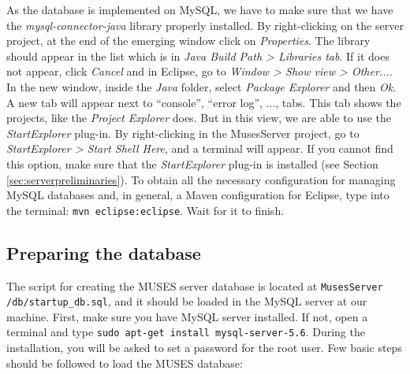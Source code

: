 As the database is implemented on MySQL, we have to make sure that we have the \textit{mysql-connector-java} library properly installed. By right-clicking on the server project, at the end of the emerging window click on \textit{Properties}. The library should appear in the list which is in \textit{Java Build Path > Libraries tab}. If it does not appear, click \textit{Cancel} and in Eclipse, go to \textit{Window > Show view > Other...}. In the new window, inside the \textit{Java} folder, select \textit{Package Explorer} and then \textit{Ok}. A new tab will appear next to ``console'', ``error log'', ..., tabs. This tab shows the projects, like the \textit{Project Explorer} does. But in this view, we are able to use the \textit{StartExplorer} plug-in. By right-clicking in the MusesServer project, go to \textit{StartExplorer > Start Shell Here}, and a terminal will appear. If you cannot find this option, make sure that the \textit{StartExplorer} plug-in is installed (see Section \ref{sec:serverpreliminaries}). To obtain all the necessary configuration for managing MySQL databases and, in general, a Maven configuration for Eclipse, type into the terminal: \texttt{mvn eclipse:eclipse}. Wait for it to finish.

\subsection{Preparing the database}
\label{subsec:database}

The script for creating the MUSES server database is located at \texttt{MusesServer\\/db/startup\_db.sql}, and it should be loaded in the MySQL server at our machine. First, make sure you have MySQL server installed. If not, open a terminal and type \texttt{sudo apt-get install mysql-server-5.6}. During the installation, you will be asked to set a password for the root user. Few basic steps \cite{mysqlguide:site} should be followed to load the MUSES database:

